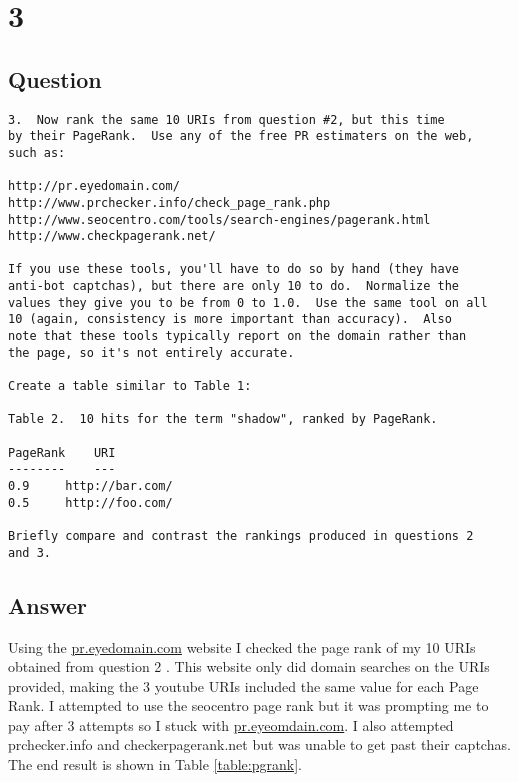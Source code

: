 \documentclass[letterpaper,11pt]{article}
\begin{document}
\clearpage


\section*{3}

\subsection*{Question}

\begin{verbatim}
3.  Now rank the same 10 URIs from question #2, but this time 
by their PageRank.  Use any of the free PR estimaters on the web,
such as:

http://pr.eyedomain.com/
http://www.prchecker.info/check_page_rank.php
http://www.seocentro.com/tools/search-engines/pagerank.html
http://www.checkpagerank.net/

If you use these tools, you'll have to do so by hand (they have
anti-bot captchas), but there are only 10 to do.  Normalize the
values they give you to be from 0 to 1.0.  Use the same tool on all
10 (again, consistency is more important than accuracy).  Also
note that these tools typically report on the domain rather than
the page, so it's not entirely accurate.  

Create a table similar to Table 1:

Table 2.  10 hits for the term "shadow", ranked by PageRank.

PageRank	URI
--------	---
0.9		http://bar.com/
0.5		http://foo.com/

Briefly compare and contrast the rankings produced in questions 2
and 3.
\end{verbatim}

\clearpage
\subsection*{Answer}

Using the \url{pr.eyedomain.com} website I checked the page rank of my 10 URIs obtained from question 2 \cite{eyedomainref}. This website only did domain searches on the URIs provided, making the 3 youtube URIs included the same value for each Page Rank. I attempted to use the seocentro page rank but it was prompting me to pay after 3 attempts so I stuck with \url{pr.eyeomdain.com}. I also attempted prchecker.info and checkerpagerank.net but was unable to get past their captchas. The end result is shown in Table \ref{table:pgrank}.
\end{document}
